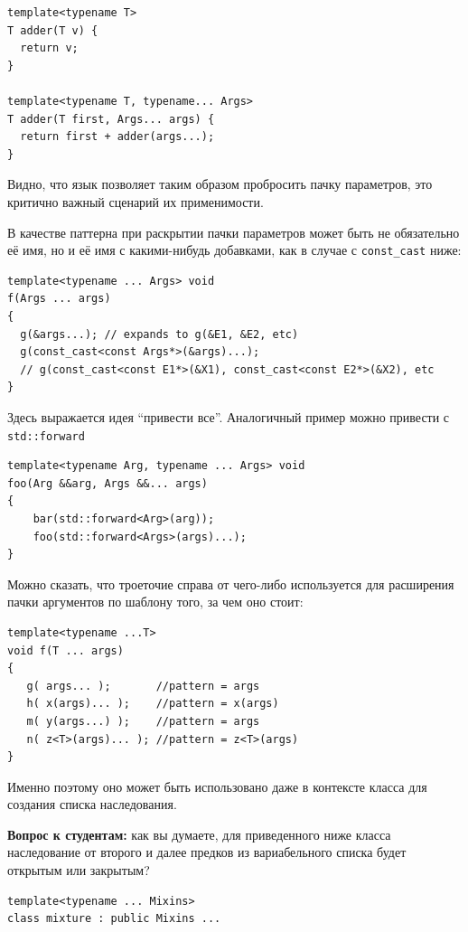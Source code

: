 \documentclass[a4paper,12pt,oneside]{article}
\begin{document}
\begin{lstlisting}
template<typename T>
T adder(T v) {
  return v;
}

template<typename T, typename... Args>
T adder(T first, Args... args) {
  return first + adder(args...);
}
\end{lstlisting}

Видно, что язык позволяет таким образом пробросить пачку параметров, это критично важный сценарий их применимости.

В качестве паттерна при раскрытии пачки параметров может быть не обязательно её имя, но и её имя с какими-нибудь добавками, как в случае с \lstinline!const_cast! ниже:

\begin{lstlisting}
template<typename ... Args> void 
f(Args ... args)
{
  g(&args...); // expands to g(&E1, &E2, etc)
  g(const_cast<const Args*>(&args)...);
  // g(const_cast<const E1*>(&X1), const_cast<const E2*>(&X2), etc
}
\end{lstlisting}

Здесь выражается идея ``привести все''. Аналогичный пример можно привести с \lstinline!std::forward!

\begin{lstlisting}
template<typename Arg, typename ... Args> void 
foo(Arg &&arg, Args &&... args)
{
    bar(std::forward<Arg>(arg));
    foo(std::forward<Args>(args)...);
}
\end{lstlisting}

Можно сказать, что троеточие справа от чего-либо используется для расширения пачки аргументов по шаблону того, за чем оно стоит:

\begin{lstlisting}
template<typename ...T>
void f(T ... args) 
{
   g( args... );       //pattern = args
   h( x(args)... );    //pattern = x(args)
   m( y(args...) );    //pattern = args
   n( z<T>(args)... ); //pattern = z<T>(args)
}
\end{lstlisting}

Именно поэтому оно может быть использовано даже в контексте класса для создания списка наследования.

\textbf{Вопрос к студентам:} как вы думаете, для приведенного ниже класса наследование от второго и далее предков из вариабельного списка будет открытым или закрытым?

\begin{lstlisting}
template<typename ... Mixins>
class mixture : public Mixins ...  
\end{lstlisting}
\end{document}
